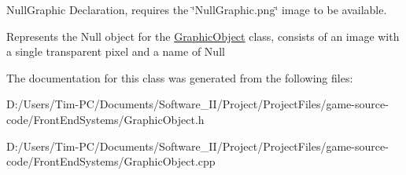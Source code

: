 Null\+Graphic Declaration, requires the \char`\"{}\+Null\+Graphic.\+png\char`\"{} image to be available. 

Represents the Null object for the \hyperlink{class_graphic_object}{Graphic\+Object} class, consists of an image with a single transparent pixel and a name of Null 

The documentation for this class was generated from the following files\+:\begin{DoxyCompactItemize}
\item 
D\+:/\+Users/\+Tim-\/\+P\+C/\+Documents/\+Software\+\_\+\+I\+I/\+Project/\+Project\+Files/game-\/source-\/code/\+Front\+End\+Systems/Graphic\+Object.\+h\item 
D\+:/\+Users/\+Tim-\/\+P\+C/\+Documents/\+Software\+\_\+\+I\+I/\+Project/\+Project\+Files/game-\/source-\/code/\+Front\+End\+Systems/Graphic\+Object.\+cpp\end{DoxyCompactItemize}
